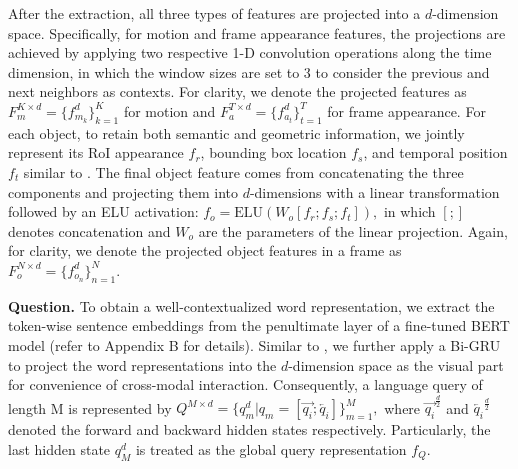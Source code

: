 \documentclass[letterpaper]{article} \usepackage{aaai21}  \usepackage{times}  \usepackage{helvet} \usepackage{courier}  \usepackage[hyphens]{url}  \usepackage{graphicx} \urlstyle{rm} \def\UrlFont{\rm}  \usepackage{natbib}  \usepackage{caption} \usepackage{color, colortbl}
\begin{document}
After the extraction, all three types of features are projected into a $d$-dimension space. Specifically, for motion and frame appearance features, the projections are achieved by applying two respective 1-D convolution operations along the time dimension, in which the window sizes are set to 3 to consider the previous and next neighbors as contexts. For clarity, we denote the projected features as $F_m^{K \times d}=\{f_{m_k}^d\}_{k=1}^K$ for motion and $F_a^{T\times d}=\{f_{a_t}^d\}_{t=1}^T$ for frame appearance. For each object, to retain both semantic and geometric information, we jointly represent its RoI appearance $f_r$, bounding box location $f_s$, and temporal position $f_t$ similar to \cite{huang2020location}. The final object feature comes from concatenating the three components and projecting them into $d$-dimensions with a linear transformation followed by an ELU activation: $f_o = \mathrm{ELU}(W_o[f_r;f_s;f_t]),$ in which $[;]$ denotes concatenation and $W_o$ are the parameters of the linear projection. Again, for clarity, we denote the projected object features in a frame as $F_o^{N\times d}=\{f_{o_n}^d\}_{n=1}^N$.


\textbf{Question.}
To obtain a well-contextualized word representation, we extract the token-wise sentence embeddings from the penultimate layer of a fine-tuned BERT model \cite{devlin2018bert} (refer to Appendix B for details). Similar to \cite{xiao2021next}, we further apply a Bi-GRU \cite{cho2014learning} to project the word representations into the $d$-dimension space as the visual part for convenience of cross-modal interaction. Consequently, a language query of length M is represented by 
$
Q^{M \times d}=\{q_m^d|q_m=[\overrightarrow{q_i}; \overleftarrow{q_i}]\}_{m=1}^M,
$
where $\overrightarrow{q_i}^{\frac{d}{2}}$ and $\overleftarrow{q_i}^{\frac{d}{2}}$ denoted the forward and backward hidden states respectively. Particularly, the last hidden state $q_{M}^d$ is treated as the global query representation $f_Q$.
\end{document}
